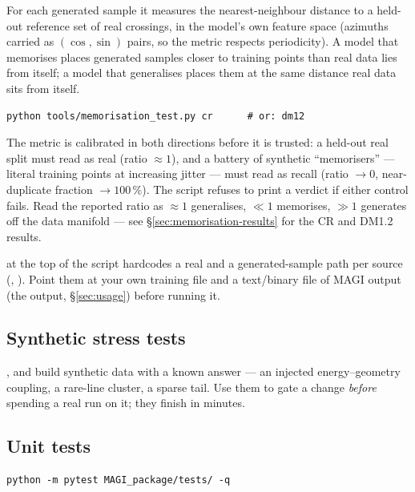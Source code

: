 \documentclass[11pt,a4paper]{article}
\begin{document}
For each generated sample it measures the nearest-neighbour distance to a
held-out reference set of real crossings, in the model's own feature space
(azimuths carried as $(\cos,\sin)$ pairs, so the metric respects
periodicity). A model that memorises places generated samples closer to
training points than real data lies from itself; a model that generalises
places them at the same distance real data sits from itself.

\begin{lstlisting}[language=shell]
python tools/memorisation_test.py cr      # or: dm12
\end{lstlisting}

The metric is calibrated in both directions before it is trusted: a held-out
real split must read as real (ratio $\approx 1$), and a battery of synthetic
``memorisers'' --- literal training points at increasing jitter --- must read
as recall (ratio $\to 0$, near-duplicate fraction $\to 100\,\%$). The script
refuses to print a verdict if either control fails. Read the reported ratio as
$\approx 1$ generalises, $\ll 1$ memorises, $\gg 1$ generates off the data
manifold --- see \S\ref{sec:memorisation-results} for the CR and DM1.2
results.

\begin{magiwarn}
 at the top of the script hardcodes a real and a
generated-sample path per source (, ). Point them at
your own training file and a text/binary file of MAGI output (the
 output, \S\ref{sec:usage}) before
running it.
\end{magiwarn}

\subsection{Synthetic stress tests}

,
 and  build synthetic
data with a known answer --- an injected energy--geometry coupling, a rare-line
cluster, a sparse tail. Use them to gate a change \emph{before} spending a real
run on it; they finish in minutes.

\subsection{Unit tests}

\begin{lstlisting}[language=shell]
python -m pytest MAGI_package/tests/ -q
\end{lstlisting}
\end{document}
